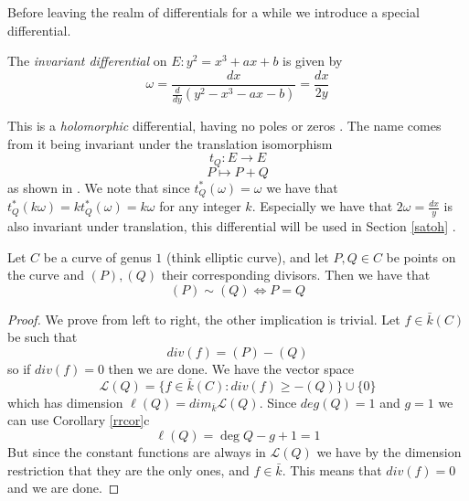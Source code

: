 Before leaving the realm of differentials for a while we introduce a special differential.
\begin{mydef}
The \emph{invariant differential} on $E: y^2 = x^3 + ax + b$ is given by
$$\omega = \frac{dx}{\frac{d}{dy}\left(y^2 - x^3  - ax - b\right)} = \frac{dx}{2y} $$
\end{mydef}
This is a \emph{holomorphic} differential, having no poles or zeros \cite{AEC}. The name comes from it
being invariant under the translation isomorphism
$$ t_Q: E \rightarrow E$$
$$ P \mapsto P + Q$$
as shown in \cite{AEC}. We note that since $t_Q^*(\omega) = \omega$ we have that
$t_Q^*(k\omega) = k t_Q^*(\omega) = k\omega$ for any integer $k$. Especially we have that
$2\omega = \frac{dx}{y}$ is also invariant under translation, this differential will be used
in Section \ref{satoh} \label{invariant}.

\begin{prop} \label{3.3}
 Let $C$ be a curve of genus $1$ (think elliptic curve), and let $P,Q\in C$ be points on the curve and
$(P), (Q)$ their corresponding divisors. Then we have that
$$ (P) \sim (Q) \iff P = Q $$
\end{prop}
\begin{proof}
 We prove from left to right, the other implication is trivial. Let $f\in \bar{k}(C)$ be such that
$$ div(f) = (P)-(Q) $$
so if $div(f) = 0$ then we are done. We have the vector space
$$ \mathscr{L}(Q) = \{ f\in \bar{k}(C) : div(f) \geq -(Q) \} \cup \{ 0 \} $$
which has dimension $\ell(Q) = dim_{\bar{k}} \mathscr{L}(Q)$. Since $deg(Q) = 1$ and $g = 1$
we can use Corollary \ref{rrcor}c 
$$\ell(Q) = \deg Q - g + 1 = 1$$
But since the constant functions are always in $\mathscr{L}(Q)$ we have by the dimension restriction that
they are the only ones, and $f \in \bar{k}$. This means that $div(f) = 0$ and we are done.
\end{proof}


